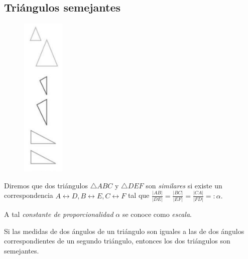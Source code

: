 \subsection{Triángulos semejantes}
{}
	\begin{figure}
		\centering
		\includegraphics[width=2cm,keepaspectratio=true]{./trig/algsup3-02.png}
		\label{fig:3-02}
	\end{figure}
	
	Diremos que dos triángulos $\triangle ABC$ y $\triangle DEF$ son \emph{similares} si 
	existe un correspondencia $A\leftrightarrow D, B\leftrightarrow E, C \leftrightarrow F$
	tal que $\frac{|AB|}{|DE|}=\frac{|BC|}{|EF|}=\frac{|CA|}{|FD|}=: \alpha.$
	
	
	A tal \emph{constante de proporcionalidad} $\alpha$ se conoce como \emph{escala}.

{}
	\begin{proposicion}
		Si las medidas de dos ángulos de un triángulo son iguales a las de dos ángulos correspondientes de un segundo triángulo, entonces los dos triángulos son semejantes.
	\end{proposicion}
	

